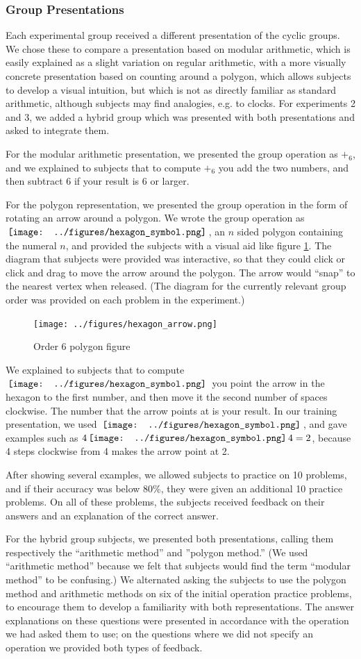 \documentclass[man,10pt]{apa6}
\newcommand{\hex}{\,\vcenter{\hbox{\texttt{[image: ../figures/hexagon\_symbol.png]}}}\,}
\begin{document}
\subsubsection{Group Presentations}
Each experimental group received a different presentation of the cyclic groups. We chose these to compare a presentation based on modular arithmetic, which is easily explained as a slight variation on regular arithmetic, with a more visually concrete presentation based on counting around a polygon, which allows subjects to develop a visual intuition, but which is not as directly familiar as standard arithmetic, although subjects may find analogies, e.g. to clocks. For experiments 2 and 3, we added a hybrid group which was presented with both presentations and asked to integrate them. \par 
For the modular arithmetic presentation, we presented the group operation as $+_6$, and we explained to subjects that to compute $+_6$ you add the two numbers, and then subtract $6$ if your result is $6$ or larger.\par
For the polygon representation, we presented the group operation in the form of rotating an arrow around a polygon. We wrote the group operation as $\hex$, an $n$ sided polygon containing the numeral $n$, and provided the subjects with a visual aid like figure \ref{hexagonex}. The diagram that subjects were provided was interactive, so that they could click or click and drag to move the arrow around the polygon. The arrow would ``snap'' to the nearest vertex when released. (The diagram for the currently relevant group order was provided on each problem in the experiment.)
\begin{figure} \centering \texttt{[image: ../figures/hexagon\_arrow.png]} \caption{Order 6 polygon figure} \label{hexagonex} \end{figure} \noindent
We explained to subjects that to compute $\hex$ you point the arrow in the hexagon to the first number, and then move it the second number of spaces clockwise. The number that the arrow points at is your result. In our training presentation, we used $\hex$, and gave examples such as $4 \hex 4 = 2$, because 4 steps clockwise from 4 makes the arrow point at 2. \par
After showing several examples, we allowed subjects to practice on 10 problems, and if their accuracy was below 80\%, they were given an additional 10 practice problems. On all of these problems, the subjects received feedback on their answers and an explanation of the correct answer. \par 
For the hybrid group subjects, we presented both presentations, calling them respectively the ``arithmetic method'' and ''polygon method.'' (We used ``arithmetic method'' because we felt that subjects would find the term ``modular method'' to be confusing.) We alternated asking the subjects to use the polygon method and arithmetic methods on six of the initial operation practice problems, to encourage them to develop a familiarity with both representations. The answer explanations on these questions were presented in accordance with the operation we had asked them to use; on the questions where we did not specify an operation we provided both types of feedback. 
\end{document}
